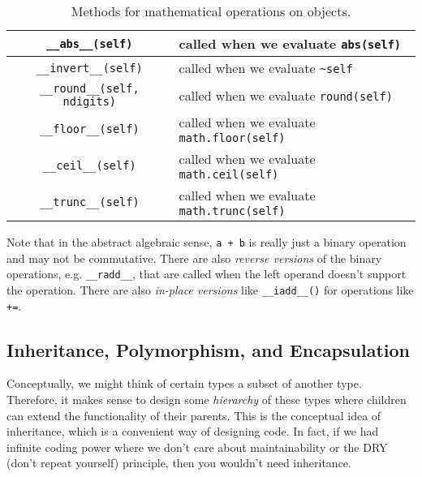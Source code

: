 \begin{definition}
\begin{table}[H]
\begin{tabular}{|c|p{8cm}|}
        \hline
        \texttt{\_\_abs\_\_(self)} & called when we evaluate \texttt{abs(self)} \\
        \hline
        \texttt{\_\_invert\_\_(self)} & called when we evaluate \texttt{\~{}self} \\
        \hline
        \texttt{\_\_round\_\_(self, ndigits)} & called when we evaluate \texttt{round(self)} \\
        \hline
        \texttt{\_\_floor\_\_(self)} & called when we evaluate \texttt{math.floor(self)} \\
        \hline
        \texttt{\_\_ceil\_\_(self)} & called when we evaluate \texttt{math.ceil(self)} \\
        \hline
        \texttt{\_\_trunc\_\_(self)} & called when we evaluate \texttt{math.trunc(self)} \\
        \hline
      \end{tabular}
      \caption{Methods for mathematical operations on objects.}
      \label{tab:mathematical_operations}
    \end{table}

    Note that in the abstract algebraic sense, \texttt{a + b} is really just a binary operation and may not be commutative. There are also \textit{reverse versions} of the binary operations, e.g. \texttt{\_\_radd\_\_}, that are called when the left operand doesn't support the operation. There are also \textit{in-place versions} like \texttt{\_\_iadd\_\_()} for operations like \texttt{+=}.  
  \end{definition}

\subsection{Inheritance, Polymorphism, and Encapsulation} 

  Conceptually, we might think of certain types a subset of another type. Therefore, it makes sense to design some \textit{hierarchy} of these types where children can extend the functionality of their parents. This is the conceptual idea of inheritance, which is a convenient way of designing code. In fact, if we had infinite coding power where we don't care about maintainability or the DRY (don't repeat yourself) principle, then you wouldn't need inheritance. 

